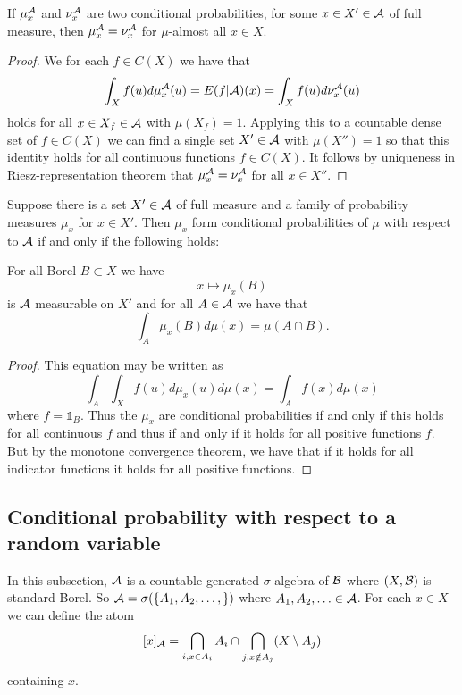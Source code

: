 \documentclass[twoside, a4paper, 10pt]{amsart}
\begin{document}
\begin{prop} If $\mu_x^{\mathcal{A}}$ and $\nu_x^{\mathcal{A}}$ are two conditional probabilities, for some $x \in X' \in \mathcal{A}$ of full measure, then $\mu_x^{\mathcal{A}} = \nu_x^{\mathcal{A}}$ for $\mu$-almost all $x \in X$.

\end{prop}

\begin{proof} We for each $f \in C(X)$ we have that $$\int_X f(u) d\mu_x^{\mathcal{A}} (u) = E(f|\mathcal{A})(x) = \int_X f(u) d\nu_x^{\mathcal{A}} (u)$$ holds for all $x \in X_f \in \mathcal{A}$ with $\mu(X_f) = 1$. Applying this to a countable dense set of $f \in C(X)$ we can find a single set $X' \in \mathcal{A}$ with $\mu(X'')=1$ so that this identity holds for all continuous functions $f \in C(X)$. It follows by uniqueness in Riesz-representation theorem that $\mu_x^{\mathcal{A}} = \nu_x^{\mathcal{A}}$ for all $x \in X''$.  \end{proof}

\begin{prop}\label{prop: cond prob intersection} Suppose there is a set $X' \in \mathcal{A}$ of full measure and a family of probability measures $\mu_{x}$ for $x \in X'$. Then $\mu_x$ form conditional probabilities of $\mu$ with respect to $\mathcal{A}$ if and only if the following holds: 

For all Borel $B \subset X$ we have $$x \mapsto \mu_x(B)$$ is $\mathcal{A}$ measurable on $X'$ and for all $A \in \mathcal{A}$ we have that $$\int_{A} \mu_x(B) d\mu(x) = \mu(A \cap B).$$

\end{prop}

\begin{proof} This equation may be written as $$\int_A \int_X f(u) d\mu_x(u) d\mu(x) = \int_A f(x) d\mu(x)$$ where $f = \mathds{1}_B$. Thus the $\mu_x$ are conditional probabilities if and only if this holds for all continuous $f$ and thus if and only if it holds for all positive functions $f$. But by the monotone convergence theorem, we have that if it holds for all indicator functions it holds for all positive functions. \end{proof}
\subsection{Conditional probability with respect to a random variable}

In this subsection, $\mathcal{A}$ is a countable generated $\sigma$-algebra of $\mathcal{B}$ where $(X,\mathcal{B})$ is standard Borel. So $\mathcal{A}= \sigma(\{A_1,A_2,\ldots, \})$ where $A_1,A_2,\ldots \in \mathcal{A}$. For each $x \in X$ we can define the atom $$[x]_{\mathcal{A}} = \bigcap_{i, x \in A_i} A_i \cap \bigcap_{j, x \notin A_j} (X \setminus A_j)$$ containing $x$.
\end{document}
